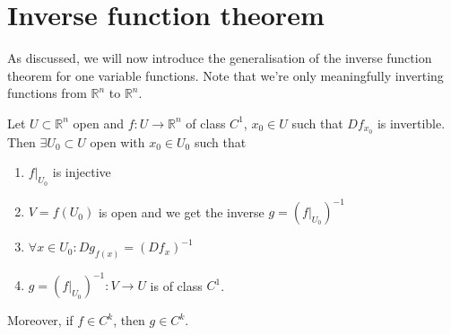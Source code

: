 \section{Inverse function theorem}

As discussed, we will now introduce the generalisation of the inverse function theorem for one variable functions. Note that we're only meaningfully inverting functions from $\mathbb{R}^{n}$ to $\mathbb{R}^{n}$.

\begin{theorem}\label{thm:inv-func-thm}
	Let $U \subset \mathbb{R}^{n}$ open and $f: U \to \mathbb{R}^{n}$ of class $C^{1}$, $x_{0} \in U$ such that $Df_{x_{0}}$ is invertible. Then $\exists U_{0} \subset U$ open with $x_{0} \in U_{0}$ such that
	\begin{enumerate}
		\item $f|_{U_{0}}$ is injective
		\item $V = f(U_{0})$ is open and we get the inverse $g = (f|_{U_{0}})^{-1}$
		\item $\forall x \in U_{0}: Dg_{f(x)} = (Df_{x})^{-1}$
		\item $g = (f|_{U_{0}})^{-1}: V \to U$ is of class $C^{1}$.
	\end{enumerate}
	Moreover, if $f \in C^{k}$, then $g \in C^{k}$.
\end{theorem}

